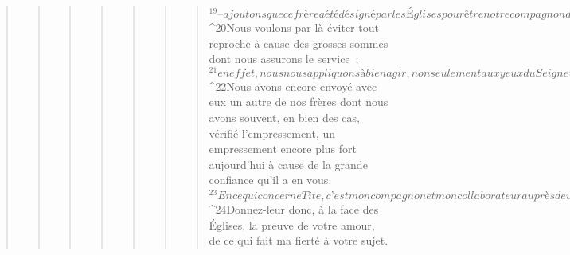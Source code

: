 \begin{verse}
\begin{verse}
\begin{verse}
\begin{verse}
\begin{verse}
\begin{verse}
\begin{verse}
${}^{19}– ajoutons que ce frère a été désigné par les Églises pour être notre compagnon de voyage, dans cette œuvre de bonté, ce service que nous accomplissons pour la gloire du Seigneur et selon notre ardent désir. 
${}^{20}Nous voulons par là éviter tout reproche à cause des grosses sommes dont nous assurons le service ; 
${}^{21}en effet, nous nous appliquons à bien agir, non seulement aux yeux du Seigneur, mais aussi aux yeux des hommes. 
${}^{22}Nous avons encore envoyé avec eux un autre de nos frères dont nous avons souvent, en bien des cas, vérifié l’empressement, un empressement encore plus fort aujourd’hui à cause de la grande confiance qu’il a en vous. 
${}^{23}En ce qui concerne Tite, c’est mon compagnon et mon collaborateur auprès de vous ; quant à nos frères, ils sont les envoyés des Églises, ils sont la gloire du Christ. 
${}^{24}Donnez-leur donc, à la face des Églises, la preuve de votre amour, de ce qui fait ma fierté à votre sujet.
      

\end{verse}
\end{verse}
\end{verse}
\end{verse}
\end{verse}
\end{verse}
\end{verse}
